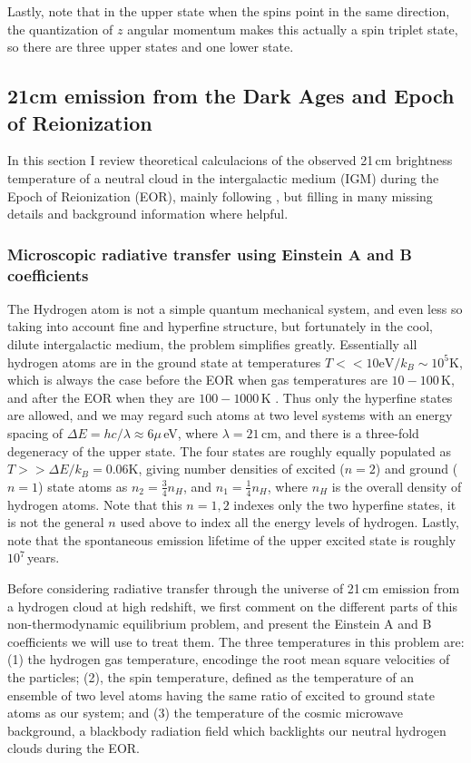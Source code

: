Lastly, note that in the upper state when the spins point in the same direction, the quantization of $z$ angular momentum makes this actually a spin triplet state, so there are three upper states and one lower state.

\subsection{21cm emission from the Dark Ages and Epoch of Reionization}

In this section I review theoretical calculacions of the observed 21\,cm brightness temperature of a neutral cloud in the intergalactic medium (IGM) during the Epoch of Reionization (EOR), mainly following \citet{PritchardLoebReview}, but filling in many missing details and background information where helpful. 

\subsubsection{Microscopic radiative transfer using Einstein A and B coefficients}

The Hydrogen atom is not a simple quantum mechanical system, and even less so taking into account fine and hyperfine structure, but fortunately in the cool, dilute intergalactic medium, the problem simplifies greatly. Essentially all hydrogen atoms are in the ground state at temperatures  $T<<10\text{eV}/k_B\sim10^5$K, which is always the case before the EOR when gas temperatures are $10-100$\,K, and after the EOR when they are $100-1000$\,K \citep{FurlanettoReview}. Thus only the hyperfine states are allowed, and we may regard such atoms at two level systems with an energy spacing of $\Delta E=hc/\lambda\approx6\mu$\,eV, where $\lambda=21$\,cm, and there is a three-fold degeneracy of the upper state. The four states are roughly equally populated as $T>>\Delta E/k_B =0.06$K, giving number densities of excited ($n=2$) and ground ($n=1$) state atoms as $n_2=\frac{3}{4}n_H$, and $n_1=\frac{1}{4}n_H$, where $n_H$ is the overall density of hydrogen atoms. Note that this $n=1,2$ indexes only the two hyperfine states, it is not the general $n$ used above to index all the energy levels of hydrogen. Lastly, note that the spontaneous emission lifetime of the upper excited state is roughly $10^7$\,years.

Before considering radiative transfer through the universe of 21\,cm emission from a hydrogen cloud at high redshift, we first comment on the different parts of this non-thermodynamic equilibrium problem, and present the Einstein A and B coefficients we will use to treat them. The three temperatures in this problem are: (1) the hydrogen gas temperature, encodinge the root mean square velocities of the particles; (2), the spin temperature, defined as the temperature of an ensemble of two level atoms having the same ratio of excited to ground state atoms as our system; and (3) the temperature of the cosmic microwave background, a blackbody radiation field which backlights our neutral hydrogen clouds during the EOR. 

